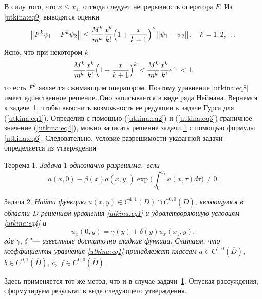 В силу того, что $x \le x_1 $, отсюда следует непрерывность оператора $F$.
Из \eqref{utkina:eq9} выводятся оценки
\[
\left\| {F^k\psi _1 - F^k\psi _2 } \right\| \le
\frac{M^k}{m^k}\frac{x^k}{k!}\Bigl(1 + \frac{x}{k + 1}\Bigr)^k\left\| {\psi _1 - \psi
_2 } \right\|,
\quad
k = 1, 2, \dots
\]
Ясно, что при некотором $k$
\[
\frac{M^k}{m^k}\frac{x^k}{k!}\Bigl(1 + \frac{x}{k + 1}\Bigr)^k <
\frac{M^k}{m^k}\frac{x_1 ^k}{k!}e^{x_1 } < 1,
\]
то есть $F^k$ является сжимающим оператором. 
Поэтому \cite{utkina:bib:Bizadze2} уравнение
\eqref{utkina:eq8} имеет единственное решение. 
Оно записывается в виде ряда Неймана.
Вернемся к задаче~\hyperlink{utask1}{1}, чтобы выяснить возможность ее редукции к задаче Гурса
для (\ref{utkina:eq1}). Определив с помощью (\ref{utkina:eq2}) и (\ref{utkina:eq3}) граничное значение (\ref{utkina:eq4}), можно
записать решение задачи \hyperlink{utask1}{1} с помощью формулы \eqref{utkina:eq6}. 
Следовательно, условие разрешимости указанной задачи определяется из утверждения

\smallskip

{\small \sc Теорема 1.} \textit{Задача} \hyperlink{utask1}{1} {\it однозначно разрешима$,$ если}
\[
a(x, 0) - \beta (x)a(x,y_1 )\exp \biggl(\int _0^{y_1 } a(x,\tau )d\tau \biggr) \ne
0.
\]

\smallskip

\hypertarget{utask2}{}

{\small \sc Задача 2.} \textit{Найти функцию} $u(x, y) \in C^{1,1}\left( D
\right) \cap C^{0, 0}\left( {\overline D } \right)$, \textit{являющуюся в области  $D$  решением уравнения \eqref{utkina:eq1} и удовлетворяющую условиям \eqref{utkina:eq4} и
\begin{equation}
\label{utkina:eq10}
u_x \left( {0,y} \right) = \gamma (y) + \delta (y)u_x \left( {x_1 ,y}
\right),
\end{equation}
где} $\gamma$, $\delta $ "--- \textit{известные достаточно гладкие функции$.$ 
Считаем, что коэффициенты уравнения \eqref{utkina:eq1} принадлежат классам} $a \in C^{1, 0}(\overline D )$, $b \in C^{0,1}(\overline D )$, $c$,~$f \in C^{0, 0}(\overline D )$.

\smallskip

Здесь применяется тот же метод, что и в случае задачи~\hyperlink{utask1}{1}.
Опуская
рассуждения, сформулируем результат в виде следующего утверждения.

\smallskip


